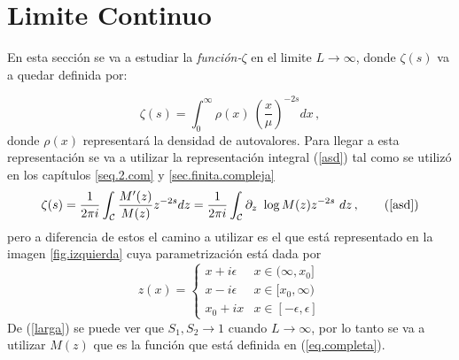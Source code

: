 \chapter{Limite Continuo}

En esta sección se va a estudiar la {\it función-$\zeta $} en el limite $L \rightarrow \infty$, donde $\zeta  (s)$ va a quedar definida por:

\begin{equation}
	\zeta (s) = \int _{0} ^{\infty} \rho (x) \ \left( \frac{x}{\mu } 			\right) ^{-2 s} dx
\, ,	
\label{eq.zeta.continuo}
\end{equation}
donde $\rho(x) $ representará la densidad de autovalores. Para llegar a esta representación se va a utilizar la representación integral (\ref{asd}) tal como se utilizó en los capítulos \ref{seq.2.com} y  \ref{sec.finita.compleja}
\begin{equation}
\zeta (s) = 
\frac{1}{2 \pi i} 
\int _{\mathcal{C}}
\frac{M ' ( z ) }{ M ( z ) } z ^{-2s} d z = 
\frac{1}{2 \pi i} 
\int _{\mathcal{C}}
\partial _z \ \log 	M(z)  z ^{-2s} \ dz
	\, ,
	\tag{\ref{asd}}
\end{equation}
pero a diferencia de estos el camino a utilizar es el que está representado en la imagen \ref{fig.izquierda} cuya parametrización está dada por 
\begin{equation}
z(x) =  
	  \begin{cases} 
      x + i \epsilon  &  x \in ( \infty, x_0] \\
      x - i \epsilon  &  x \in  [ x_0, \infty) \\
      x _0 + i x	  &  x \in [-\epsilon,\epsilon]
   \end{cases}
\label{eq.para.con}
\end{equation}
De (\ref{larga}) se puede ver que $S _1,S _2 \rightarrow 1$ cuando $L \rightarrow \infty$, por lo tanto se va a utilizar $M (z)$ que es la función que está definida en (\ref{eq.completa}).\\

